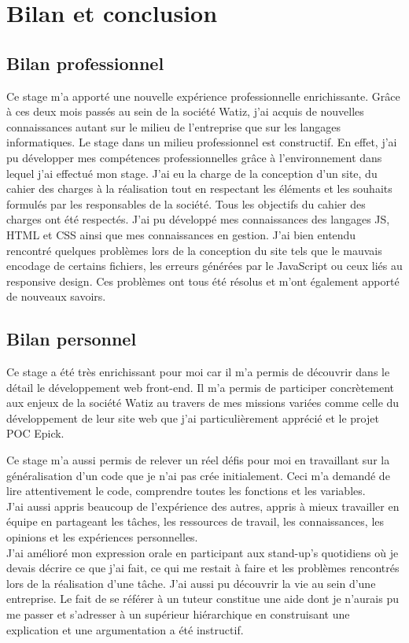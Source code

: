 \documentclass[a4paper, 12pt]{report}
\begin{document}
\chapter{ Bilan et conclusion}
\section{Bilan professionnel}
Ce stage m’a apporté une nouvelle expérience professionnelle enrichissante. Grâce à ces deux mois passés au sein de la société Watiz, j’ai acquis de nouvelles connaissances autant sur le milieu de l’entreprise que sur les langages informatiques. Le stage dans un milieu professionnel est constructif. En effet, j’ai pu développer mes compétences professionnelles grâce à l’environnement dans lequel j’ai effectué mon stage. J’ai eu la charge de la conception d’un site, du cahier des charges à la réalisation tout en respectant les éléments et les souhaits formulés par les responsables de la société. Tous les objectifs du cahier des charges ont été respectés. J’ai pu développé mes connaissances des langages JS, HTML et CSS ainsi que mes connaissances en gestion. J’ai bien entendu rencontré quelques problèmes lors de la conception du site tels que le mauvais encodage de certains fichiers, les erreurs générées par le JavaScript ou ceux liés au responsive design. Ces problèmes ont tous été résolus et m’ont également apporté de nouveaux savoirs. 
\section{Bilan personnel}
Ce stage a été très enrichissant pour moi car il m’a permis de découvrir dans le détail le développement web front-end. Il m’a permis de participer concrètement aux enjeux de la société Watiz au travers de mes missions variées comme celle du développement de leur site web que j’ai particulièrement apprécié et le projet POC Epick.

Ce stage m’a aussi permis de relever un réel défis pour moi en travaillant sur la généralisation d'un code que je n'ai pas crée initialement. Ceci m'a demandé de lire attentivement le code, comprendre toutes les fonctions et les variables.\\
J'ai aussi appris beaucoup de l'expérience des autres, appris à mieux travailler en équipe en partageant les tâches, les ressources de travail, les connaissances, les opinions et les expériences personnelles.\\
J'ai amélioré mon expression orale en participant aux stand-up's quotidiens où je devais décrire ce que j'ai fait, ce qui me restait à faire et les problèmes rencontrés lors de la réalisation d'une tâche. 
J’ai aussi pu découvrir la vie au sein d’une entreprise. Le fait de se référer à un tuteur constitue une aide dont je n’aurais pu me passer et s’adresser à un supérieur hiérarchique en construisant une explication et une argumentation a été instructif.
\\
\end{document}
